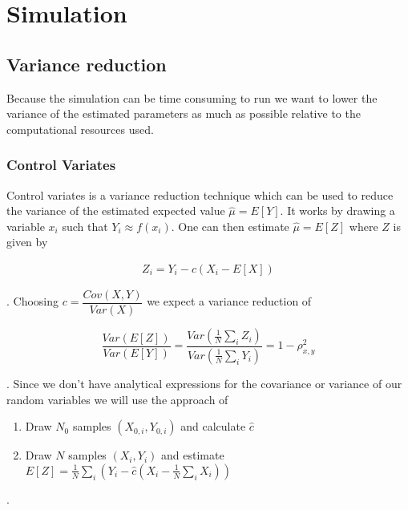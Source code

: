 \section{Simulation}
\subsection{Variance reduction}
Because the simulation can be time consuming to run we want to lower the variance of the estimated parameters as much as possible relative to the computational resources used. 

\subsubsection{Control Variates}
Control variates is a variance reduction technique which can be used to reduce the variance of the estimated expected value $\hat{\mu} =E[Y]$. It works by drawing a variable $x_i$ such that $Y_i \approx f(x_i)$. One can then estimate $\hat{\mu} =E[Z]$ where $Z$ is given by

\begin{align}
Z_i = Y_i - c (X_i - E[X]) 
\end{align}

. Choosing $c = \dfrac{Cov(X, Y)}{Var(X)}$ we expect a variance reduction of

\begin{equation}
\frac{Var(E[Z])}{Var(E[Y])} = \frac{ Var(\frac{1}{N} \sum_i Z_i) }{ Var(\frac{1}{N} \sum_i Y_i )} = 1 - \rho_{x, y}^2
\end{equation}

. Since we don't have analytical expressions for the covariance or variance of our random variables we will use the approach of

\begin{enumerate}
	\item Draw $N_0$ samples $(X_{0,i}, Y_{0, i})$ and calculate $\hat{c}$
	\item Draw $N$ samples $(X_i, Y_i)$ and estimate $E[Z] = \frac{1}{N} \sum_i \left( Y_i - \hat{c} (X_i - \frac{1}{N}\sum_i X_i) \right)  $
\end{enumerate}

.